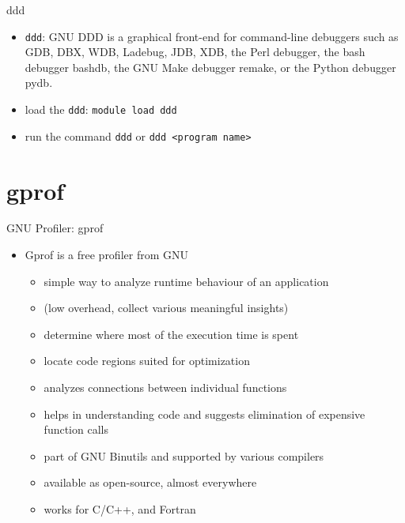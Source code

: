 \documentclass[10pt,t]{beamer}
\begin{document}
\begin{frame}[fragile]{ddd}
  \begin{itemize}
    \item \lstinline|ddd|: GNU DDD is a graphical front-end for command-line debuggers such as GDB, DBX, WDB, Ladebug, JDB, XDB, the Perl debugger, the bash debugger bashdb, the GNU Make debugger remake, or the Python debugger pydb. 
    \item load the \lstinline|ddd|: \lstinline|module load ddd|
    \item run the command \lstinline|ddd| or \lstinline|ddd <program name>|
  \end{itemize}
\end{frame}



\section{gprof}
\begin{frame}{GNU Profiler: gprof}
  \begin{itemize}
  \item Gprof is a free profiler from GNU
    \begin{itemize}
      \item simple way to analyze runtime behaviour of an application 
      \item[] (low overhead, collect various meaningful insights)
      \item determine where most of the execution time is spent
      \item[] locate code regions suited for optimization
      \item analyzes connections between individual functions
      \item[]  helps in understanding code and suggests elimination of expensive function calls
      \item part of GNU Binutils and supported by various compilers
      \item[] available as open-source, almost everywhere
      \item works for C/C++, and Fortran
    \end{itemize}
  \end{itemize}
\end{frame}
\end{document}
